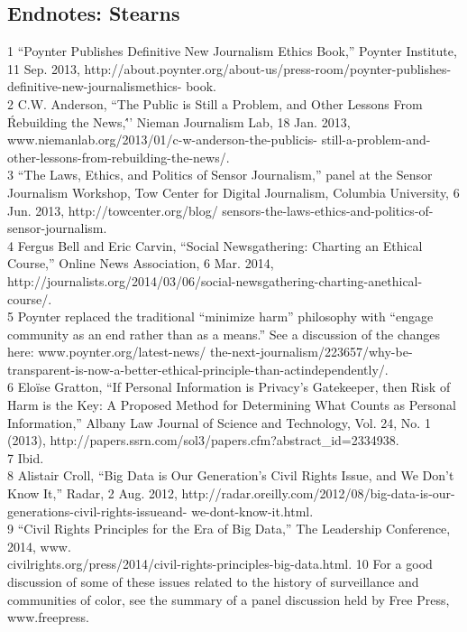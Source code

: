 \begin{itemize}
\begin{itemized}
\begin{itemize}
\section{Endnotes: Stearns}
1 ``Poynter Publishes Definitive New Journalism Ethics Book,'' Poynter Institute, 11 Sep. 2013,
http://about.poynter.org/about-us/press-room/poynter-publishes-definitive-new-journalismethics-
book.\\
2 C.W. Anderson, ``The Public is Still a Problem, and Other Lessons From \'Rebuilding the News,\'''
Nieman Journalism Lab, 18 Jan. 2013, www.niemanlab.org/2013/01/c-w-anderson-the-publicis-
still-a-problem-and-other-lessons-from-rebuilding-the-news/.\\
3 ``The Laws, Ethics, and Politics of Sensor Journalism,'' panel at the Sensor Journalism Workshop,
Tow Center for Digital Journalism, Columbia University, 6 Jun. 2013, http://towcenter.org/blog/
sensors-the-laws-ethics-and-politics-of-sensor-journalism.\\
4 Fergus Bell and Eric Carvin, ``Social Newsgathering: Charting an Ethical Course,'' Online News
Association, 6 Mar. 2014, http://journalists.org/2014/03/06/social-newsgathering-charting-anethical-
course/.\\
5 Poynter replaced the traditional ``minimize harm'' philosophy with ``engage community as an end
rather than as a means.'' See a discussion of the changes here: www.poynter.org/latest-news/
the-next-journalism/223657/why-be-transparent-is-now-a-better-ethical-principle-than-actindependently/.\\
6 Eloïse Gratton, ``If Personal Information is Privacy's Gatekeeper, then Risk of Harm is the Key: A
Proposed Method for Determining What Counts as Personal Information,'' Albany Law Journal of
Science and Technology, Vol. 24, No. 1 (2013), http://papers.ssrn.com/sol3/papers.cfm?abstract_id=2334938.\\
7 Ibid.\\
8 Alistair Croll, ``Big Data is Our Generation's Civil Rights Issue, and We Don't Know It,'' Radar, 2 Aug. 2012, http://radar.oreilly.com/2012/08/big-data-is-our-generations-civil-rights-issueand-
we-dont-know-it.html.\\
9 ``Civil Rights Principles for the Era of Big Data,'' The Leadership Conference, 2014, www.\\
civilrights.org/press/2014/civil-rights-principles-big-data.html.
10 For a good discussion of some of these issues related to the history of surveillance and
communities of color, see the summary of a panel discussion held by Free Press, www.freepress.

\end{itemize}
\end{itemized}
\end{itemize}
